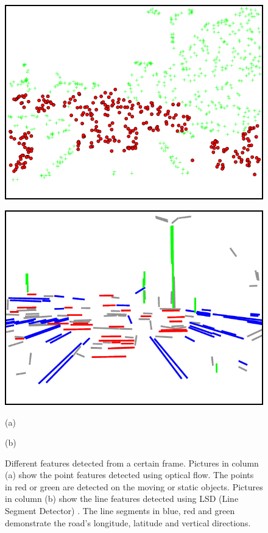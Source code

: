 \documentclass[letterpaper, 10 pt, conference]{ieeeconf}  %
\begin{document}
\begin{figure}
\begin{minipage}[t]{0.48\linewidth}
    \includegraphics[width=1\textwidth]{source//Final//image0130_277in785_blank.png}
    \label{fig:line_in_blank}
  \end{minipage}%
  \hfill
 \begin{minipage}[t]{0.48\linewidth}
    \centering
    \includegraphics[width=1\textwidth]{source//Final//image0130_84in144_blank.png}
    \label{fig:point_int_blank}
  \end{minipage}%
  \vfill
 \begin{minipage}[t]{0.48\linewidth}
    \centering
    (a)
  \end{minipage}%
  \hfill
 \begin{minipage}[t]{0.48\linewidth}
    \centering
    (b)
  \end{minipage}%
\caption{Different features detected from a certain frame. Pictures in column (a) show the point features detected using optical flow. The points in red or green are detected on the moving or static objects. Pictures in column (b) show the line features detected using LSD (Line Segment Detector) \cite{von2012lsd}. The line segments in blue, red and green demonstrate the road's longitude, latitude and vertical directions.}
\label{fig:features}
\end{figure}
\end{document}
